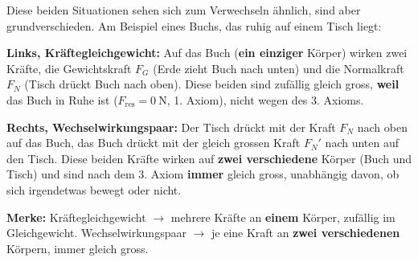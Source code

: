 \documentclass[addpoints,11pt,a4paper]{exam}
\begin{document}
\begin{hinweisbox}
Diese beiden Situationen sehen sich zum Verwechseln ähnlich, sind aber
grundverschieden. Am Beispiel eines Buchs, das ruhig auf einem Tisch
liegt:

\begin{center}
\end{center}

\textbf{Links, Kräftegleichgewicht:} Auf das Buch (\textbf{ein einziger}
Körper) wirken zwei Kräfte, die Gewichtskraft $F_G$ (Erde zieht Buch
nach unten) und die Normalkraft $F_N$ (Tisch drückt Buch nach oben).
Diese beiden sind zufällig gleich gross, \textbf{weil} das Buch in Ruhe
ist ($F_{\text{res}}=\SI{0}{\newton}$, 1. Axiom), nicht wegen des 3.
Axioms.

\textbf{Rechts, Wechselwirkungspaar:} Der Tisch drückt mit der Kraft
$F_N$ nach oben auf das Buch, das Buch drückt mit der gleich grossen
Kraft $F_N'$ nach unten auf den Tisch. Diese beiden Kräfte wirken auf
\textbf{zwei verschiedene} Körper (Buch und Tisch) und sind nach dem 3.
Axiom \textbf{immer} gleich gross, unabhängig davon, ob sich irgendetwas
bewegt oder nicht.

\textbf{Merke:} Kräftegleichgewicht $\to$ mehrere Kräfte an
\textbf{einem} Körper, zufällig im Gleichgewicht. Wechselwirkungspaar
$\to$ je eine Kraft an \textbf{zwei verschiedenen} Körpern, immer gleich
gross.
\end{hinweisbox}
\end{document}
